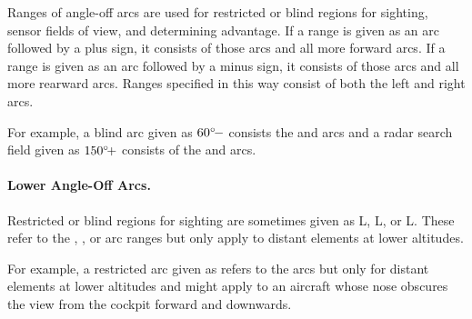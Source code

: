 {Ranges of angle-off arcs are used for restricted or blind regions for sighting, sensor fields of view, and determining advantage. If a range is given as an arc followed by a plus sign, it consists of those arcs and all more forward arcs. If a range is given as an arc followed by a minus sign, it consists of those arcs and all more rearward arcs. Ranges specified in this way consist of both the left and right arcs.

For example, a blind arc given as $\mbox{$60{^\circ}\!-$}$ consists the  and  arcs and a radar search field given as $\mbox{$150{^\circ}\!+$}$ consists of the  and  arcs. 

\paragraph{Lower Angle-Off Arcs.}
\label{rule:lower-angle-off-arcs}

Restricted or blind regions for sighting are sometimes given as L, L, or L. These refer to the , , or  arc ranges but only apply to distant elements at lower altitudes.

For example, a restricted arc given as  refers to the  arcs but only for distant elements at lower altitudes and might apply to an aircraft whose nose obscures the view from the cockpit forward and downwards.

}

